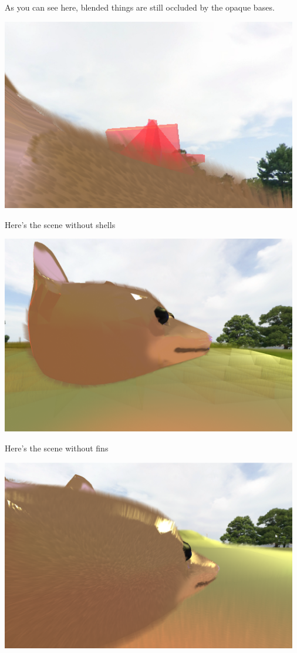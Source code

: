 \documentclass[a4paper, 12pt]{article}
\begin{document}
    As you can see here, blended things are still occluded by the opaque bases.

    \includegraphics[width=35em]{depth}

    Here's the scene without shells

    \includegraphics[width=35em]{fins}

    Here's the scene without fins

    \includegraphics[width=35em]{shells}
\end{document}
